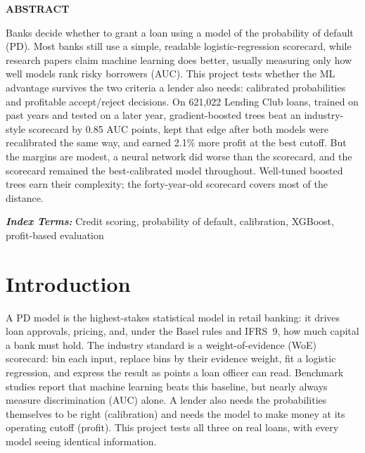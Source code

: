 \documentclass[a4paper,twocolumn,10pt]{article}
\begin{document}

\begin{center}\textbf{ABSTRACT}\end{center}
\noindent
Banks decide whether to grant a loan using a model of the probability of default (PD). Most banks still use a simple, readable logistic-regression scorecard, while research papers claim machine learning does better, usually measuring only how well models rank risky borrowers (AUC). This project tests whether the ML advantage survives the two criteria a lender also needs: calibrated probabilities and profitable accept/reject decisions. On 621{,}022 Lending Club loans, trained on past years and tested on a later year, gradient-boosted trees beat an industry-style scorecard by 0.85 AUC points, kept that edge after both models were recalibrated the same way, and earned 2.1\% more profit at the best cutoff. But the margins are modest, a neural network did worse than the scorecard, and the scorecard remained the best-calibrated model throughout. Well-tuned boosted trees earn their complexity; the forty-year-old scorecard covers most of the distance.

\vspace{2mm}
\noindent\textbf{\textit{Index Terms:}} Credit scoring, probability of default, calibration, XGBoost, profit-based evaluation

\section{Introduction}
A PD model is the highest-stakes statistical model in retail banking: it drives loan approvals, pricing, and, under the Basel rules and IFRS~9, how much capital a bank must hold. The industry standard is a weight-of-evidence (WoE) scorecard: bin each input, replace bins by their evidence weight, fit a logistic regression, and express the result as points a loan officer can read. Benchmark studies report that machine learning beats this baseline, but nearly always measure discrimination (AUC) alone. A lender also needs the probabilities themselves to be right (calibration) and needs the model to make money at its operating cutoff (profit). This project tests all three on real loans, with every model seeing identical information.
\end{document}
